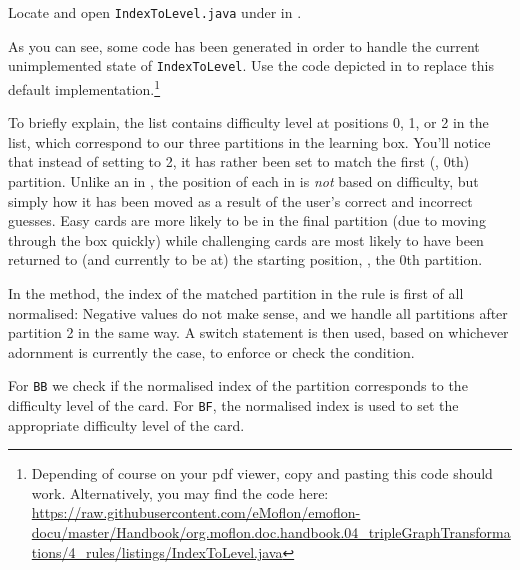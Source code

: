\begin{stepbystep}
\item Locate and open \texttt{IndexToLevel.java} under  in .

\item As you can see, some code has been generated in order to handle the current unimplemented state of \texttt{IndexToLevel}. 
Use the code depicted in  to replace this default implementation.\footnote{Depending of course on your pdf viewer, copy and pasting this code should work.
Alternatively, you may find the code here: \url{https://raw.githubusercontent.com/eMoflon/emoflon-docu/master/Handbook/org.moflon.doc.handbook.04_tripleGraphTransformations/4_rules/listings/IndexToLevel.java}}



\end{stepbystep}

To briefly explain, the  list contains difficulty level at positions 0, 1, or 2 in the list, which correspond to our three partitions in the learning box. 
You'll notice that instead of setting  to 2, it has rather been set to match the first (\idest, 0th) partition. 
Unlike an  in , the position of each  in  is \emph{not} based on difficulty, but simply how it has been moved as a result of the user's correct and incorrect guesses. 
Easy cards are more likely to be in the final partition (due to moving through the box quickly) while challenging cards are most likely to have been returned to (and currently to be at) the starting position, \idest, the 0th partition.

In the  method, the index of the matched partition in the rule is first of all normalised:
Negative values do not make sense, and we handle all partitions  after partition 2 in the same way.
A switch statement is then used, based on whichever adornment is currently the case, to enforce or check the condition. 

For \texttt{BB} we check if the normalised index of the partition corresponds to the difficulty level of the card.
For \texttt{BF}, the normalised index is used to set the appropriate difficulty level of the card.

